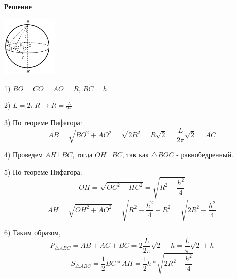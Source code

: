     \textbf{Решение}\\

    \begin{center}
        \includegraphics[width=0.2\textwidth]{images/img9}\\
    \end{center}

    1) $BO = CO = AO = R$, $BC = h$

    2) $L = 2\pi R\rightarrow R = \frac{L}{2\pi}$

    3) По теореме Пифагора:
    \[
        AB = \sqrt {BO ^ 2 + AO ^ 2} = \sqrt {2R^2} = R\sqrt {2} = \frac{L}{2\pi}\sqrt {2} = AC
    \]

    4) Проведем $AH \bot BC$, тогда $OH \bot BC$, так как $\triangle BOC$ - равнобедренный.

    5) По теореме Пифагора:
    \[
        OH = \sqrt {OC ^ 2 - HC ^ 2} = \sqrt {R ^ 2 - \frac{h ^ 2}{4}}
    \]
    \[
        AH = \sqrt {OH ^ 2 + AO ^ 2} = \sqrt {R ^ 2 - \frac{h ^ 2}{4} + R ^ 2} = \sqrt {2R^2 - \frac{h ^ 2}{4}}
    \]

    6) Таким образом,
    \[
        P_{\triangle ABC} = AB + AC + BC = 2\frac{L}{2\pi}\sqrt {2} + h = \frac{L}{\pi}\sqrt {2} + h
    \]
    \[
        S_{\triangle ABC} = \frac{1}{2} BC * AH = \frac{1}{2} h * \sqrt {2R^2 - \frac{h ^ 2}{4}}
    \]



